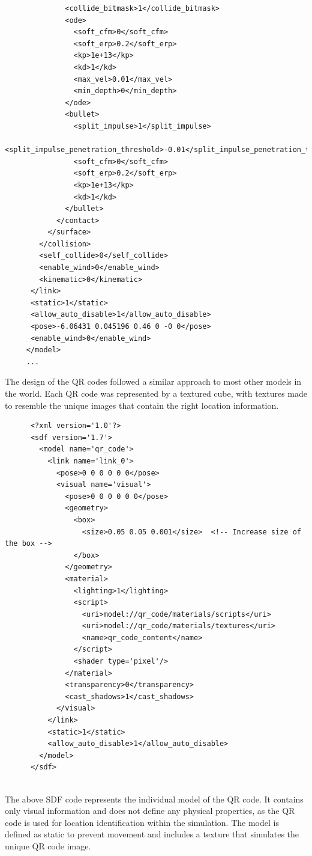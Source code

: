\documentclass[../../main]{subfiles}
\begin{document}
\begin{itemize}
\begin{verbatim}
              <collide_bitmask>1</collide_bitmask>
              <ode>
                <soft_cfm>0</soft_cfm>
                <soft_erp>0.2</soft_erp>
                <kp>1e+13</kp>
                <kd>1</kd>
                <max_vel>0.01</max_vel>
                <min_depth>0</min_depth>
              </ode>
              <bullet>
                <split_impulse>1</split_impulse>
                <split_impulse_penetration_threshold>-0.01</split_impulse_penetration_threshold>
                <soft_cfm>0</soft_cfm>
                <soft_erp>0.2</soft_erp>
                <kp>1e+13</kp>
                <kd>1</kd>
              </bullet>
            </contact>
          </surface>
        </collision>
        <self_collide>0</self_collide>
        <enable_wind>0</enable_wind>
        <kinematic>0</kinematic>
      </link>
      <static>1</static>
      <allow_auto_disable>1</allow_auto_disable>
      <pose>-6.06431 0.045196 0.46 0 -0 0</pose>
      <enable_wind>0</enable_wind>
     </model>
     ...
\end{verbatim}
The design of the QR codes followed a similar approach to most other models in the 
world. Each QR code was represented by a textured cube, with textures made to 
resemble the unique images that contain the right location information.
\newpage
    \begin{verbatim}
      <?xml version='1.0'?>
      <sdf version='1.7'>
        <model name='qr_code'>
          <link name='link_0'>
            <pose>0 0 0 0 0 0</pose>
            <visual name='visual'>
              <pose>0 0 0 0 0 0</pose>
              <geometry>
                <box>
                  <size>0.05 0.05 0.001</size>  <!-- Increase size of the box -->
                </box>
              </geometry>
              <material>
                <lighting>1</lighting>
                <script>
                  <uri>model://qr_code/materials/scripts</uri>
                  <uri>model://qr_code/materials/textures</uri>
                  <name>qr_code_content</name>
                </script>
                <shader type='pixel'/>
              </material>
              <transparency>0</transparency> 
              <cast_shadows>1</cast_shadows>
            </visual>
          </link>
          <static>1</static>
          <allow_auto_disable>1</allow_auto_disable>
        </model>
      </sdf>
    
    \end{verbatim}

The above SDF code represents the individual model of the QR code. It contains 
only visual information and does not define any physical properties, as the QR 
code is used for location identification within the simulation. The model is defined 
as static to prevent movement and includes a texture that simulates the unique QR 
code image.


\end{itemize}
\end{document}
